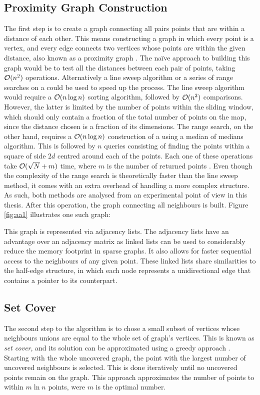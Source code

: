 \subsection{Proximity Graph Construction}
The first step is to create a graph connecting all pairs points that are within a distance of each other. This means constructing a graph in which every point is a vertex, and every edge connects two vertices whose points are within the given distance, also known as a proximity graph \cite{proximity}. The naïve approach to building this graph would be to test all the distances between each pair of points, taking $\mathcal{O}(n^2)$ operations. Alternatively a line sweep algorithm or a series of range searches on a \kdtree could be used to speed up the process. The line sweep algorithm would require a $\mathcal{O}(n \log{n})$ sorting algorithm, followed by $\mathcal{O}(n^2)$ comparisons. However, the latter is limited by the number of points within the sliding window, which should only contain a fraction of the total number of points on the map, since the distance chosen is a fraction of its dimensions. The \kdtree range search, on the other hand, requires a $\mathcal{O}(n \log{n})$ construction of a \kdtree using a median of medians algorithm. This is followed by $n$ queries consisting of finding the points within a square of side $2d$ centred around each of the points. Each one of these operations take $\mathcal{O}(\sqrt{N}+m)$ time, where $m$ is the number of returned points \cite{kdrange}. Even though the complexity of the \kdtree range search is theoretically faster than the line sweep method, it comes with an extra overhead of handling a more complex structure. As such, both methods are analysed from an experimental point of view in this thesis. After this operation, the graph connecting all neighbours is built. Figure \ref{fig:aa1} illustrates one such graph:



This graph is represented via adjacency lists. The adjacency lists have an advantage over an adjacency matrix as linked lists can be used to considerably reduce the memory footprint in sparse graphs. It also allows for faster sequential access to the neighbours of any given point. These linked lists share similarities to the half-edge structure, in which each node represents a unidirectional edge that contains a pointer to its counterpart.

\subsection{Set Cover}
The second step to the algorithm is to chose a small subset of vertices whose neighbours unions are equal to the whole set of graph's vertices. This is known as \emph{set cover}, and its solution can be approximated using a greedy approach \cite{greedyapprox}. Starting with the whole uncovered graph, the point with the largest number of uncovered neighbours is selected. This is done iteratively until no uncovered points remain on the graph. This approach approximates the number of points to within $m \ln{n}$ points, were $m$ is the optimal number.

